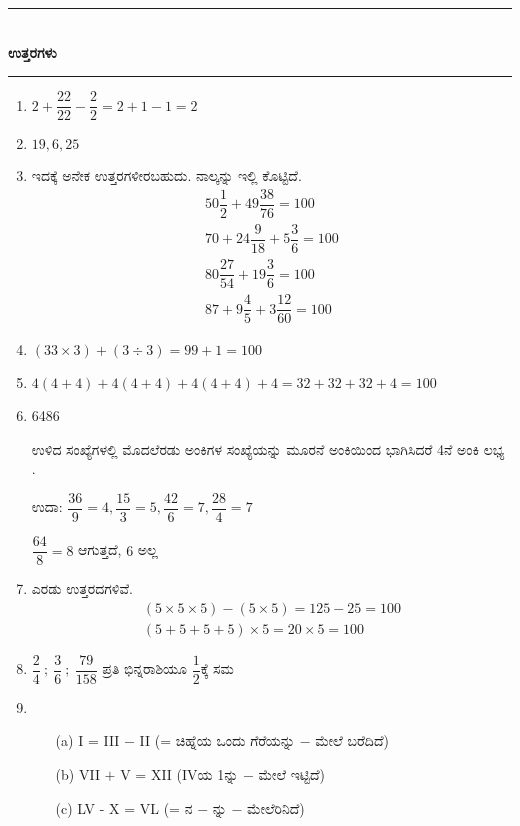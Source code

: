 \smallskip

\begin{center}
\rule{5cm}{1pt}\\[5pt]
{\Large\bfseries ಉತ್ತರಗಳು}\\[3pt]
\rule{5cm}{1pt}
\end{center}

\begin{enumerate}
\item $2 + \dfrac{22}{22} - \dfrac{2}{2} = 2 + 1 - 1 = 2$

\item $19, 6, 25$

\item ಇದಕ್ಕೆ ಅನೇಕ ಉತ್ತರಗಳೀರಬಹುದು. ನಾಲ್ಕನ್ನು ಇಲ್ಲಿ ಕೊಟ್ಟಿದೆ. 
\begin{gather*}
50\dfrac{1}{2} + 49\dfrac{38}{76} = 100\\
70 + 24\dfrac{9}{18} + 5\dfrac{3}{6} = 100\\
80\dfrac{27}{54} + 19\dfrac{3}{6} = 100\\
87 + 9\dfrac{4}{5} + 3\dfrac{12}{60} = 100
\end{gather*}

\item $(33\times 3) + (3\div 3) = 99 + 1 = 100$

\item $4 (4+4) + 4(4+4) + 4(4+4) + 4 = 32 + 32 + 32 + 4 = 100$

\item 6486

ಉಳಿದ ಸಂಖ್ಯೆಗಳಲ್ಲಿ ಮೊದಲೆರಡು ಅಂಕಿಗಳ ಸಂಖ್ಯೆಯನ್ನು ಮೂರನೆ ಅಂಕಿಯಿಂದ ಭಾಗಿಸಿದರೆ 4ನೆ ಅಂಕಿ ಲಭ್ಯ .

ಉದಾ: $\dfrac{36}{9} = 4, \dfrac{15}{3} = 5, \dfrac{42}{6} = 7, \dfrac{28}{4} = 7$

$\dfrac{64}{8} = 8$ ಆಗುತ್ತದೆ, $6$ ಅಲ್ಲ 

\item ಎರಡು ಉತ್ತರದಗಳಿವೆ. 
\begin{gather*}
(5\times 5\times 5) - (5\times 5) = 125 - 25 = 100\\
(5+5+5+5)\times 5 = 20\times 5 = 100
\end{gather*}

\item $\dfrac{2}{4} ~;~ \dfrac{3}{6} ~;~ \dfrac{79}{158}$ ಪ್ರತಿ ಭಿನ್ನರಾಶಿಯೂ $\dfrac{1}{2}$ಕ್ಕೆ ಸಮ 

\item 
\begin{itemize}
\item[(a)] I = III $-$ II (= ಚಿಹ್ನೆಯ ಒಂದು ಗೆರೆಯನ್ನು $-$ ಮೇಲೆ ಬರೆದಿದೆ)
\item[(b)] VII $+$ V = XII (IVಯ 1ನ್ನು $-$ ಮೇಲೆ ಇಟ್ಟಿದೆ)
\item[(c)] LV - X = VL (= ನ $-$ ನ್ನು $-$ ಮೇಲೆರಿನಿದೆ)
\end{itemize}


\end{enumerate}
